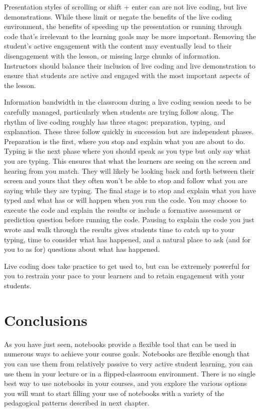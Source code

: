 \documentclass[]{book}
\begin{document}
Presentation styles of scrolling or shift + enter can are not live
coding, but live demonstrations. While these limit or negate the
benefits of the live coding environment, the benefits of speeding up the
presentation or running through code that's irrelevant to the learning
goals may be more important. Removing the student's active engagement
with the content may eventually lead to their disengagement with the
lesson, or missing large chunks of information. Instructors should
balance their inclusion of live coding and live demonstration to ensure
that students are active and engaged with the most important aspects of
the lesson.

Information bandwidth in the classroom during a live coding session
needs to be carefully managed, particularly when students are trying
follow along. The rhythm of live coding roughly has three stages:
preparation, typing, and explanation. These three follow quickly in
succession but are independent phases. Preparation is the first, where
you stop and explain what you are about to do. Typing is the next phase
where you should speak as you type but only say what you are typing.
This ensures that what the learners are seeing on the screen and hearing
from you match. They will likely be looking back and forth between their
screen and yours that they often won't be able to stop and follow what
you are saying while they are typing. The final stage is to stop and
explain what you have typed and what has or will happen when you run the
code. You may choose to execute the code and explain the results or
include a formative assessment or prediction question before running the
code. Pausing to explain the code you just wrote and walk through the
results gives students time to catch up to your typing, time to consider
what has happened, and a natural place to ask (and for you to as for)
questions about what has happened.

Live coding does take practice to get used to, but can be extremely
powerful for you to restrain your pace to your learners and to retain
engagement with your students.

\section{Conclusions}\label{conclusions-1}

As you have just seen, notebooks provide a flexible tool that can be
used in numerous ways to achieve your course goals. Notebooks are
flexible enough that you can use them from relatively passive to very
active student learning, you can use them in your lecture or in a
flipped-classroom environment. There is no single best way to use
notebooks in your courses, and you explore the various options you will
want to start filling your use of notebooks with a variety of the
pedagogical patterns described in next chapter.
\end{document}
